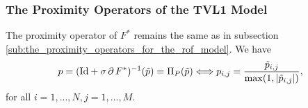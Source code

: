 \documentclass{scrreprt}
\begin{document}

        \subsubsection{The Proximity Operators of the TVL1 Model} %
        \label{ssub:the_proximity_operators_of_the_tvl1_model}
            
            The proximity operator of $F^{\ast}$ remains the same as in subsection \ref{sub:the_proximity_operators_for_the_rof_model}. We have
                $$
                    p = (\textnormal{Id} + \sigma\,\partial\,F^{\ast})^{-1}(\tilde{p}) = \Pi_{P}(\tilde{p}) \Longleftrightarrow p_{i,j} = \frac{\tilde{p}_{i, j}}{\max(1, |\tilde{p}_{i, j}|)},
                $$
            for all $i = 1, ..., N, j = 1, ..., M$.
\end{document}
